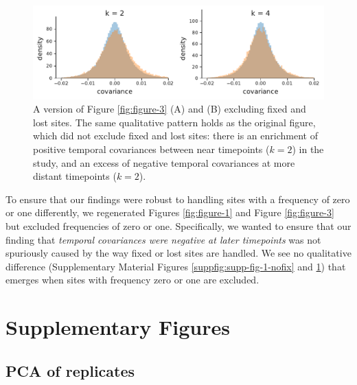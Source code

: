 \documentclass[11pt]{article}
\newcommand{\vb}[1]{{\it \color{blue} #1}}
\begin{document}
\begin{figure}[!ht]
  \centering
  \includegraphics{figures/figure-3-hists-b-without-fixations.pdf}

  \caption{A version of Figure \ref{fig:figure-3} (A) and (B) excluding fixed
    and lost sites. The same qualitative pattern holds as the original figure,
    which did not exclude fixed and lost sites: there is an enrichment of
    positive temporal covariances between near timepoints ($k=2$) in the
  \textcite{Barghi2019-qy} study, and an excess of negative temporal
covariances at more distant timepoints ($k=2$). }

  \label{suppfig:supp-fig-3-nofix}
\end{figure}


To ensure that our findings were robust to handling sites with a frequency of
zero or one differently, we regenerated Figures \ref{fig:figure-1} and Figure
\ref{fig:figure-3} but excluded frequencies of zero or one. Specifically, we
wanted to ensure that our finding that \vb{temporal covariances were negative
at later timepoints} was not spuriously caused by the way fixed or lost sites
are handled. We see no qualitative difference (Supplementary Material Figures
\ref{suppfig:supp-fig-1-nofix} and \ref{suppfig:supp-fig-3-nofix}) that emerges
when sites with frequency zero or one are excluded.

\setcounter{section}{1}
\section*{Supplementary Figures}

\subsection{PCA of \textcite{Barghi2019-qy} replicates}
\end{document}
